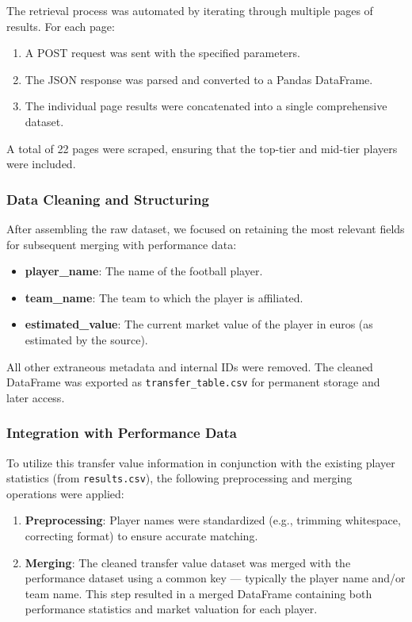 \documentclass[a4paper,12pt]{article}
\begin{document}
The retrieval process was automated by iterating through multiple pages of results. For each page:

\begin{enumerate}
    \item A POST request was sent with the specified parameters.
    \item The JSON response was parsed and converted to a Pandas DataFrame.
    \item The individual page results were concatenated into a single comprehensive dataset.
\end{enumerate}

A total of 22 pages were scraped, ensuring that the top-tier and mid-tier players were included.

\subsubsection{Data Cleaning and Structuring}

After assembling the raw dataset, we focused on retaining the most relevant fields for subsequent merging with performance data:

\begin{itemize}
    \item \textbf{player\_name}: The name of the football player.
    \item \textbf{team\_name}: The team to which the player is affiliated.
    \item \textbf{estimated\_value}: The current market value of the player in euros (as estimated by the source).
\end{itemize}

All other extraneous metadata and internal IDs were removed. The cleaned DataFrame was exported as \texttt{transfer\_table.csv} for permanent storage and later access.

\subsubsection{Integration with Performance Data}

To utilize this transfer value information in conjunction with the existing player statistics (from \texttt{results.csv}), the following preprocessing and merging operations were applied:

\begin{enumerate}
    \item \textbf{Preprocessing}: Player names were standardized (e.g., trimming whitespace, correcting format) to ensure accurate matching.
    \item \textbf{Merging}: The cleaned transfer value dataset was merged with the performance dataset using a common key — typically the player name and/or team name. This step resulted in a merged DataFrame containing both performance statistics and market valuation for each player.
\end{enumerate}
\end{document}
